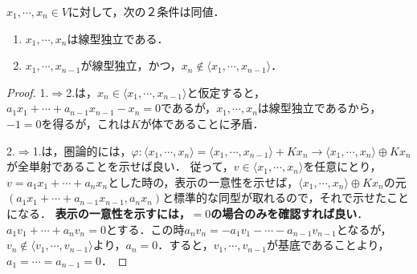 \documentclass[uplatex, 12pt, dvipdfmx]{jsreport}
\begin{document}
\begin{proposition}\label{prop-linear-system-expansion}
    $x_1,\cdots,x_n\in V$に対して，次の２条件は同値．
    \begin{enumerate}
        \item $x_1,\cdots,x_n$は線型独立である．
        \item $x_1,\cdots,x_{n-1}$が線型独立，かつ，$x_n\notin\langle x_1,\cdots,x_{n-1}\rangle$．
    \end{enumerate}
\end{proposition}
\begin{proof}
    1.$\Rightarrow$2.は，$x_n\in\langle x_1,\cdots,x_{n-1}\rangle$と仮定すると，
    $a_1x_1+\cdots+a_{n-1}x_{n-1}-x_n=0$であるが，$x_1,\cdots,x_n$は線型独立であるから，$-1=0$を得るが，これは$K$が体であることに矛盾．

    2.$\Rightarrow$1.は，圏論的には，$\varphi:\langle x_1,\cdots,x_{n}\rangle=\langle x_1,\cdots,x_{n-1}\rangle+Kx_n\to\langle x_1,\cdots,x_n\rangle\oplus Kx_n$が全単射であることを示せば良い．
    従って，$v\in\langle x_1,\cdots,x_{n}\rangle$を任意にとり，$v=a_1x_1+\cdots+a_nx_n$とした時の，表示の一意性を示せば，$\langle x_1,\cdots,x_n\rangle\oplus Kx_n$の元$(a_1x_1+\cdots+a_{n-1}x_{n-1},a_nx_n)$と標準的な同型が取れるので，それで示せたことになる．
    \textbf{表示の一意性を示すには，$=0$の場合のみを確認すれば良い}．
    $a_1v_1+\cdots+a_nv_n=0$とする．この時$a_nv_n=-a_1v_1-\cdots-a_{n-1}v_{n-1}$となるが，$v_n\notin\langle v_1,\cdots,v_{n-1}\rangle$より，$a_n=0$．すると，$v_1,\cdots,v_{n-1}$が基底であることより，$a_1=\cdots=a_{n-1}=0$．
\end{proof}
\end{document}
